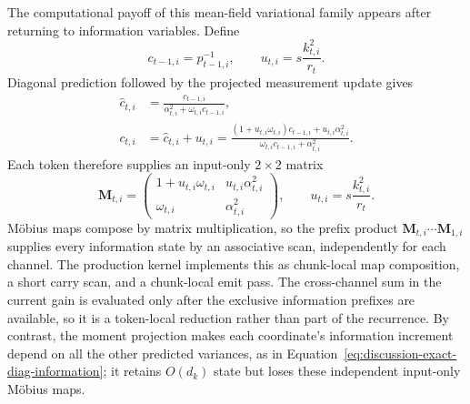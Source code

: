 \documentclass[11pt]{article}
\newcommand{\vct}[1]{\boldsymbol{#1}}
\begin{document}
The computational payoff of this mean-field variational family appears after returning to
information variables. Define
\begin{equation}
  c_{t-1,i}=p_{t-1,i}^{-1},
  \qquad
  u_{t,i}=s\frac{k_{t,i}^2}{r_t}.
  \label{eq:discussion-projected-info-increment}
\end{equation}
Diagonal prediction followed by the projected measurement update gives
\begin{align}
  \widehat c_{t,i}
  &=\frac{c_{t-1,i}}
    {\alpha_{t,i}^2+\omega_{t,i}c_{t-1,i}}, \\
  c_{t,i}
  &=\widehat c_{t,i}+u_{t,i}
  =\frac{(1+u_{t,i}\omega_{t,i})c_{t-1,i}
      +u_{t,i}\alpha_{t,i}^2}
    {\omega_{t,i}c_{t-1,i}+\alpha_{t,i}^2}.
  \label{eq:discussion-projected-info-mobius}
\end{align}
Each token therefore supplies an input-only $2\times2$ matrix
\begin{equation}
  \vct{M}_{t,i}
  =\begin{pmatrix}
    1+u_{t,i}\omega_{t,i} & u_{t,i}\alpha_{t,i}^2\\[2pt]
    \omega_{t,i} & \alpha_{t,i}^2
  \end{pmatrix},
  \qquad
  u_{t,i}=s\frac{k_{t,i}^2}{r_t}.
  \label{eq:discussion-mobius-matrix}
\end{equation}
M\"obius maps compose by matrix multiplication, so the prefix product
$\vct{M}_{t,i}\cdots\vct{M}_{1,i}$ supplies every information state by an associative scan,
independently for each channel. The production kernel implements this as chunk-local map
composition, a short carry scan, and a chunk-local emit pass. The cross-channel sum in the current gain is
evaluated only after the exclusive information prefixes are available, so it is a token-local
reduction rather than part of the recurrence. By contrast, the moment projection makes each
coordinate's information increment depend on all the other predicted variances, as in
Equation~\eqref{eq:discussion-exact-diag-information}; it retains $O(d_k)$ state but loses these
independent input-only M\"obius maps.
\end{document}
